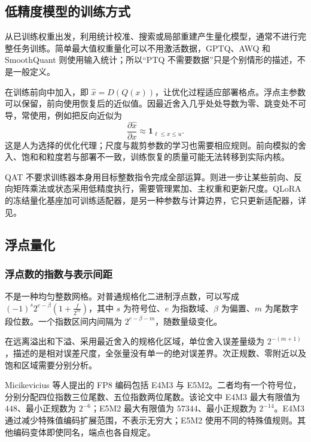 \documentclass[../textbook.tex]{subfiles}
\begin{document}
\subsection{低精度模型的训练方式}

从已训练权重出发，利用统计校准、搜索或局部重建产生量化模型，通常不进行完整任务训练。简单最大值权重量化可以不用激活数据，GPTQ、AWQ 和 SmoothQuant 则使用输入统计；所以“PTQ 不需要数据”只是个别情形的描述，不是一般定义。

在训练前向中加入，即 $\widehat x=D(Q(x))$，让优化过程适应部署格点\cite{jacob2018integerquantization}。浮点主参数可以保留，前向使用恢复后的近似值。因最近舍入几乎处处导数为零、跳变处不可导，常使用，例如把反向近似为
\begin{equation}
\frac{\partial\widehat x}{\partial x}\approx\mathbf1_{\ell\le x\le u}.
\end{equation}
这是人为选择的优化代理；尺度与裁剪参数的学习也需要相应规则。前向模拟的舍入、饱和和粒度若与部署不一致，训练恢复的质量可能无法转移到实际内核。

QAT 不要求训练器本身用目标整数指令完成全部运算。则进一步让某些前向、反向矩阵乘法或状态采用低精度执行，需要管理累加、主权重和更新尺度。QLoRA 的冻结量化基座加可训练适配器，是另一种参数与计算边界，它只更新适配器，详见。

\subsection{浮点量化}
\optional
\subsubsection{浮点数的指数与表示间距}
不是一种均匀整数网格。对普通规格化二进制浮点数，可以写成 $(-1)^s2^{e-\beta}(1+\frac{f}{2^m})$，其中 $s$ 为符号位、$e$ 为指数域、$\beta$ 为偏置、$m$ 为尾数字段位数。一个指数区间内间隔为 $2^{e-\beta-m}$，随数量级变化。

在远离溢出和下溢、采用最近舍入的规格化区域，单位舍入误差量级为 $2^{-(m+1)}$，描述的是相对误差尺度，全张量没有单一的绝对误差界。次正规数、零附近以及饱和区域需要分别分析。

Micikevicius 等人提出的 FP8 编码包括 E4M3 与 E5M2\cite{micikevicius2022fp8}。二者均有一个符号位，分别分配四位指数三位尾数、五位指数两位尾数。该论文中 E4M3 最大有限值为 $448$、最小正规数为 $2^{-6}$；E5M2 最大有限值为 $57344$、最小正规数为 $2^{-14}$。E4M3 通过减少特殊值编码扩展范围，不表示无穷大；E5M2 使用不同的特殊值规则。其他编码变体即使同名，端点也各自规定。
\end{document}
